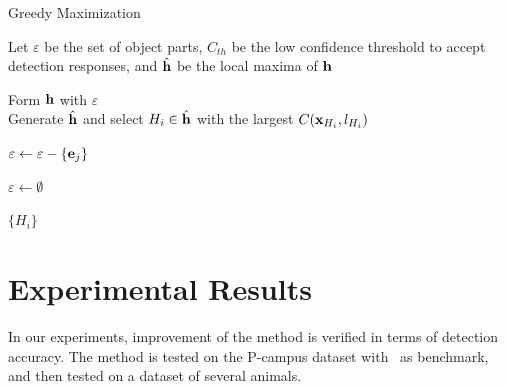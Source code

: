 \documentclass{mva2011}
\begin{document}
\begin{algorithm}[h]

    \caption{Greedy Maximization}
    \label{alg:gm}
     Let $\varepsilon$ be the set of object parts, $C_{th}$ be the low confidence threshold to accept detection responses, and $\hat{\bf{h}}$ be the local maxima of $\bf{h}$



    \begin{algorithmic}[1]




        \WHILE {$\varepsilon \ne \emptyset$}

            \STATE Form $\bf{h}$ with $\varepsilon$\\

            \STATE Generate $\hat{\bf{h}}$ and select $H_i \in {\hat{\bf{h}}} $ with the largest $   C({\bf{x}}_{H_i},l_{H_i})   $







                    \STATE $\varepsilon\leftarrow \varepsilon -\{ {\bf{e}}_j \}$

                    \ENDIF

                \ENDFOR

            \ELSE



                \STATE $\varepsilon\leftarrow \emptyset$

            \ENDIF

        \ENDWHILE
    \RETURN $\{H_i\}$

    \end{algorithmic}

\end{algorithm}

\section{Experimental Results}
In our experiments, improvement of the method is verified in terms of detection accuracy. The method is tested on the P-campus dataset with~\cite{ac9} as benchmark, and then tested on a dataset of several animals.
\end{document}
